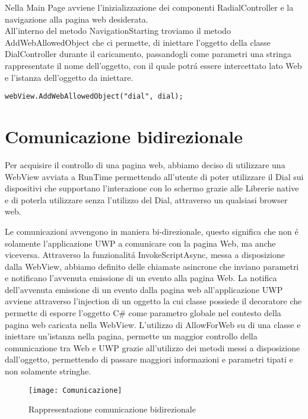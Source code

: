 Nella Main Page avviene l’inizializzazione dei componenti RadialController e la navigazione alla pagina web desiderata.\\

All’interno del metodo NavigationStarting troviamo il metodo AddWebAllowedObject che ci permette, di iniettare l’oggetto della classe DialController durante il caricamento, passandogli come parametri una stringa rappresentate il nome dell'oggetto, con il quale potrá essere intercettato lato Web e l'istanza dell'oggetto da iniettare.

\begin{lstlisting}[caption={Injection oggetto C\#},style=javaScriptCode]
webView.AddWebAllowedObject("dial", dial);
\end{lstlisting}
\section{Comunicazione bidirezionale}
Per acquisire il controllo di una pagina web, abbiamo deciso di utilizzare una WebView avviata a RunTime permettendo all'utente di poter utilizzare il Dial sui dispositivi che supportano l'interazione con lo schermo grazie alle Librerie native e di poterla utilizzare senza l'utilizzo del Dial, attraverso un qualsiasi browser web.
 
Le comunicazioni avvengono in maniera bi-direzionale, questo significa che non é solamente l'applicazione UWP a comunicare con la pagina Web, ma anche viceversa.
Attraverso la funzionalitá InvokeScriptAsync, messa a disposizione dalla WebView, abbiamo definito delle chiamate asincrone che inviano parametri e notificano l'avvenuta emissione di un evento alla pagina Web.
La notifica dell'avvenuta emissione di un evento dalla pagina web all'applicazione UWP avviene attraverso l'injection di un oggetto la cui classe possiede il decoratore \emph{\@AllowForWeb} che permette di esporre l'oggetto C\# come parametro globale nel contesto della pagina web caricata nella WebView.
L'utilizzo di AllowForWeb su di una classe e iniettare un'istanza nella pagina, permette un maggior controllo della comunicazione tra Web e UWP grazie all'utilizzo dei metodi messi a disposizione dall'oggetto, permettendo di passare maggiori informazioni e parametri tipati e non solamente stringhe.
\begin{figure}[htpb!]
  \centering
  \texttt{[image: Comunicazione]}
  \caption{Rappresentazione comunicazione bidirezionale}
\end{figure}

